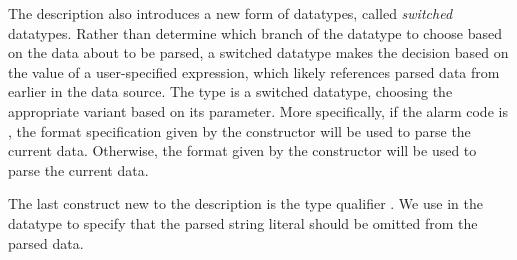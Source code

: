 
The \darkstar{} description also introduces a new form of datatypes,
called \textit{switched} datatypes. Rather than determine which branch
of the datatype to choose based on the data about to be parsed, a
switched datatype makes the decision based on the value of a
user-specified \ocaml{} expression, which likely references parsed
data from earlier in the data source. The  type is a switched
datatype, choosing the appropriate variant based on its
 parameter.  More specifically, if the alarm code is
, the format specification given by the 
constructor will be used to parse the current data.  Otherwise, the
format given by the  constructor will be used to parse the
current data.

The last construct new to the \darkstar{} description is the type qualifier
. We use  in the  datatype to specify
that the parsed string literal should be omitted from the parsed
data. 

